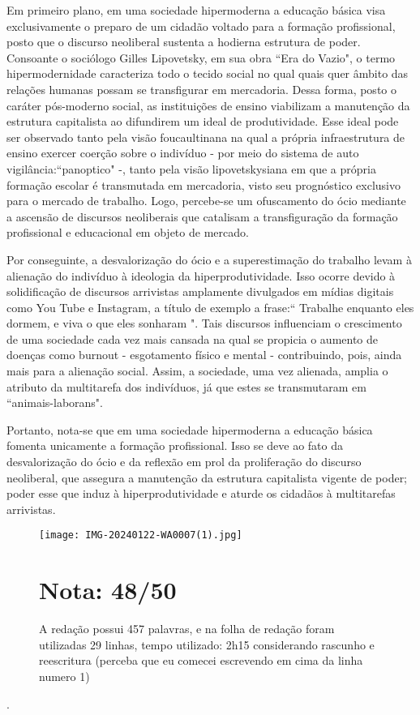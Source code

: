 \documentclass{article}
\begin{document}
Em primeiro plano, em uma sociedade hipermoderna a educação básica visa exclusivamente o preparo de um cidadão voltado para a formação profissional, posto que o discurso neoliberal sustenta a hodierna estrutura de poder. Consoante o sociólogo Gilles Lipovetsky, em sua obra “Era do Vazio", o termo hipermodernidade caracteriza todo o tecido social no qual quais quer âmbito das relações humanas possam se transfigurar em mercadoria. Dessa forma, posto o caráter pós-moderno social, as instituições de ensino viabilizam a manutenção da estrutura capitalista ao difundirem um ideal de produtividade. Esse ideal pode ser observado tanto pela visão foucaultinana na qual a própria infraestrutura de ensino exercer coerção sobre o indivíduo  - por meio do sistema de auto vigilância:“panoptico" -, tanto pela visão lipovetskysiana em que a própria formação escolar é transmutada em mercadoria, visto seu prognóstico exclusivo para o mercado de trabalho. Logo, percebe-se um ofuscamento do ócio mediante a ascensão de discursos neoliberais que catalisam a transfiguração da formação profissional e educacional em objeto de mercado.

Por conseguinte, a desvalorização do ócio e a superestimação do trabalho levam à alienação do indivíduo à ideologia da hiperprodutividade. Isso ocorre devido à solidificação de discursos arrivistas amplamente divulgados em mídias digitais como You Tube e Instagram, a título de exemplo a frase:“ Trabalhe enquanto eles dormem, e viva o que eles sonharam ". Tais discursos influenciam o crescimento de uma sociedade cada vez mais cansada na qual se propicia o aumento de doenças como burnout - esgotamento físico e mental - contribuindo, pois, ainda mais para a alienação social. Assim, a sociedade, uma vez alienada, amplia o atributo da multitarefa dos indivíduos, já que estes se transmutaram em “animais-laborans".

Portanto, nota-se que em uma sociedade hipermoderna a educação básica fomenta unicamente a formação profissional. Isso se deve ao fato da desvalorização do ócio e da reflexão em prol da proliferação do discurso neoliberal, que assegura a manutenção da estrutura capitalista vigente de poder; poder esse que induz à hiperprodutividade e aturde os cidadãos à multitarefas arrivistas.

\newpage 
\begin{figure}
\centering
\texttt{[image: IMG-20240122-WA0007(1).jpg]}
\caption{\label{}A redação possui 457 palavras, e na folha de redação foram utilizadas 29 linhas, tempo utilizado: 2h15 considerando rascunho e reescritura
(perceba que eu comecei escrevendo em cima da linha numero 1) }

\section*{Nota: 48/50}
\end{figure}.
\end{document}
